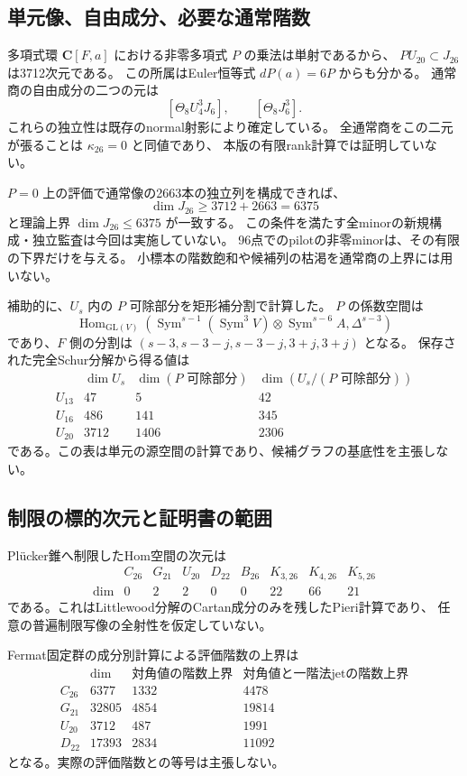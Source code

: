 \subsection{単元像、自由成分、必要な通常階数}

多項式環 $\mathbf C[F,a]$ における非零多項式 $P$ の乗法は単射であるから、
$PU_{20}\subset J_{26}$ は3712次元である。
この所属はEuler恒等式 $dP(a)=6P$ からも分かる。
通常商の自由成分の二つの元は
\[
 [\Theta_8U_4^3J_6],\qquad [\Theta_8J_6^3].
\]
これらの独立性は既存のnormal射影により確定している。
全通常商をこの二元が張ることは $\kappa_{26}=0$ と同値であり、
本版の有限rank計算では証明していない。

$P=0$ 上の評価で通常像の2663本の独立列を構成できれば、
\[
 \dim J_{26}\geq3712+2663=6375
\]
と理論上界 $\dim J_{26}\leq6375$ が一致する。
この条件を満たす全minorの新規構成・独立監査は今回は実施していない。
96点でのpilotの非零minorは、その有限の下界だけを与える。
小標本の階数飽和や候補列の枯渇を通常商の上界には用いない。

補助的に、$U_s$ 内の $P$ 可除部分を矩形補分割で計算した。
$P$ の係数空間は
\[
 \operatorname{Hom}_{\mathrm{GL}(V)}
 \left(\operatorname{Sym}^{s-1}(\operatorname{Sym}^3V)
 \otimes\operatorname{Sym}^{s-6}A,\Delta^{s-3}\right)
\]
であり、$F$ 側の分割は
$(s-3,s-3-j,s-3-j,3+j,3+j)$ となる。
保存された完全Schur分解から得る値は
\[
\begin{array}{c|r|r|r}
 &\dim U_s&\dim(P\text{ 可除部分})&\dim(U_s/(P\text{ 可除部分}))\\\hline
U_{13}&47&5&42\\
U_{16}&486&141&345\\
U_{20}&3712&1406&2306
\end{array}
\]
である。この表は単元の源空間の計算であり、候補グラフの基底性を主張しない。

\subsection{制限の標的次元と証明書の範囲}

Pl\"ucker錐へ制限したHom空間の次元は
\[
\begin{array}{c|rrrrrrrr}
 &C_{26}&G_{21}&U_{20}&D_{22}&B_{26}&K_{3,26}&K_{4,26}&K_{5,26}\\\hline
\dim&0&2&2&0&0&22&66&21
\end{array}
\]
である。これはLittlewood分解のCartan成分のみを残したPieri計算であり、
任意の普遍制限写像の全射性を仮定していない。

Fermat固定群の成分別計算による評価階数の上界は
\[
\begin{array}{c|r|r|r}
 &\dim&\text{対角値の階数上界}&\text{対角値と一階法jetの階数上界}\\\hline
C_{26}&6377&1332&4478\\
G_{21}&32805&4854&19814\\
U_{20}&3712&487&1991\\
D_{22}&17393&2834&11092
\end{array}
\]
となる。実際の評価階数との等号は主張しない。

